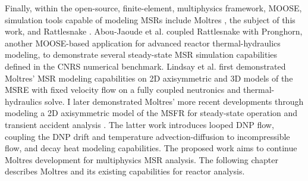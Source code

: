 Finally, within the open-source, finite-element, multiphysics framework, MOOSE,
simulation tools capable of modeling
\glspl{MSR} include Moltres \cite{lindsay_moltres_2017}, the subject of
this work, and Rattlesnake \cite{wang_rattlesnake_2021}. Abou-Jaoude et al.
\cite{abou-jaoude_coupled_2020} coupled Rattlesnake with Pronghorn, another
MOOSE-based application for advanced reactor thermal-hydraulics modeling, to
demonstrate several steady-state \gls{MSR} simulation capabilities defined in
the \gls{CNRS} numerical benchmark. Lindsay et al.
\cite{lindsay_introduction_2018} first demonstrated Moltres' \gls{MSR} modeling
capabilities on 2D axisymmetric and 3D models of the \gls{MSRE} with fixed
velocity flow on a fully coupled neutronics and thermal-hydraulics solve. I
later demonstrated Moltres' more recent developments through modeling a 2D
axisymmetric model of the \gls{MSFR} for steady-state operation and transient
accident analysis \cite{park_advancement_2020}. The latter work introduces
looped \gls{DNP} flow, coupling the \gls{DNP} drift and temperature 
advection-diffusion to incompressible flow, and decay heat modeling
capabilities. The proposed work aims to continue Moltres development for
multiphysics \gls{MSR} analysis. The following chapter describes Moltres and
its existing capabilities for reactor analysis.

